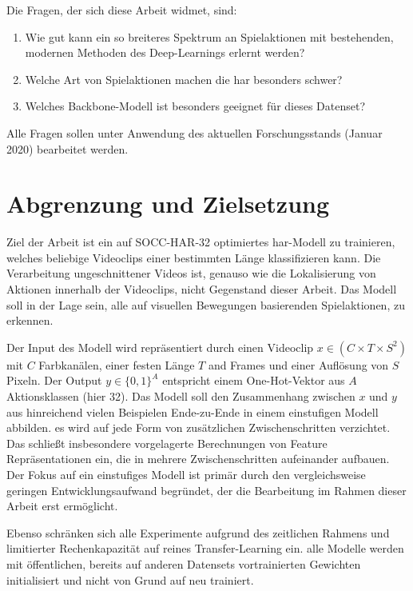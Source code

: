 Die Fragen, der sich diese Arbeit widmet, sind:
\begin{enumerate}
    \item Wie gut kann ein so breiteres Spektrum an Spielaktionen mit bestehenden, modernen Methoden des Deep-Learnings erlernt werden?
    \item Welche Art von Spielaktionen machen die \gls{har} besonders schwer?
    \item Welches Backbone-Modell ist besonders geeignet für dieses Datenset?
\end{enumerate}

Alle Fragen sollen unter Anwendung des aktuellen Forschungsstands (Januar 2020) bearbeitet werden.

\section{Abgrenzung und Zielsetzung}
\label{sec:zielsetzung}

Ziel der Arbeit ist ein auf SOCC-HAR-32 optimiertes \gls{har}-Modell zu trainieren, welches beliebige Videoclips einer bestimmten Länge klassifizieren kann.
Die Verarbeitung ungeschnittener Videos ist, genauso wie die Lokalisierung von Aktionen innerhalb der Videoclips, nicht Gegenstand dieser Arbeit.
Das Modell soll in der Lage sein, alle auf visuellen Bewegungen basierenden Spielaktionen, zu erkennen.

Der Input des Modell wird repräsentiert durch einen Videoclip $x \in (C \times T \times S^2)$ mit $C$ Farbkanälen, einer festen Länge $T$ and Frames und einer Auflösung von $S$ Pixeln.
Der Output $y \in \{0, 1\}^A$ entspricht einem One-Hot-Vektor aus $A$ Aktionsklassen (hier 32).
Das Modell soll den Zusammenhang zwischen $x$ und $y$ aus hinreichend vielen Beispielen Ende-zu-Ende in einem einstufigen Modell abbilden.
\Dh es wird auf jede Form von zusätzlichen Zwischenschritten verzichtet.
Das schließt insbesondere vorgelagerte Berechnungen von Feature Repräsentationen ein, die in mehrere Zwischenschritten aufeinander aufbauen.
Der Fokus auf ein einstufiges Modell ist primär durch den vergleichsweise geringen Entwicklungsaufwand begründet, der die Bearbeitung im Rahmen dieser Arbeit erst ermöglicht.

Ebenso schränken sich alle Experimente aufgrund des zeitlichen Rahmens und limitierter Rechenkapazität auf reines Transfer-Learning ein.
\Dh alle Modelle werden mit öffentlichen, bereits auf anderen Datensets vortrainierten Gewichten initialisiert und nicht von Grund auf neu trainiert.

